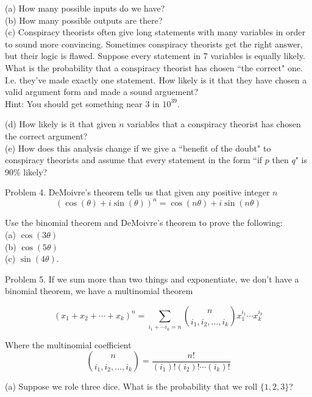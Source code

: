 \documentclass[16 pt]{amsart}
\theoremstyle{definition}
\theoremstyle{remark}
\numberwithin{equation}{subsection}
\begin{document}
(a) How many possible inputs do we have?\\

(b) How many possible outputs are there?\\

(c) Conspiracy theorists often give long statements with many variables in order to sound more convincing.  Sometimes conspiracy theorists get the right answer, but their logic is flawed.  Suppose every statement in 7 variables is equally likely.  What is the probability that a conspiracy theorist has chosen ``the correct" one.  I.e. they've made exactly one statement.  How likely is it that they have chosen a valid argument form and made a sound arguement?\\
Hint: You should get something near 3 in $10^{39}$.


(d) How likely is it that given $n$ variables that a conspiracy theorist has chosen the correct argument?\\

(e) How does this analysis change if we give a ``benefit of the doubt" to conspiracy theorists and assume that every statement in the form  ``if $p$ then $q$" is 90\% likely?

\newpage 

Problem 4. DeMoivre's theorem tells us that given any positive integer $n$
\[
(\cos(\theta)+ i \sin(\theta))^n = \cos(n\theta) + i \sin(n\theta)
\]

Use the binomial theorem and DeMoivre's theorem to prove the following:\\

(a) $\cos(3\theta)$\\

(b) $\cos(5\theta)$\\

(c) $\sin(4\theta)$.

\newpage

Problem 5. If we sum more than two things and exponentiate, we don't have a binomial theorem, we have a multinomial theorem

\[
(x_1 + x_2 + \cdots + x_k)^n = \sum_{i_1+\cdots i_k = n} \binom{n}{i_1,i_2,\dots,i_k}x_1^{i_1}\cdots x_k^{i_k}
\]

Where the multinomial coefficient
\[
\binom{n}{i_1,i_2,\dots,i_k} = \frac{n!}{(i_1)!(i_2)!\cdots(i_k)!}
\]

(a) Suppose we role three dice.  What is the probability that we roll $\{1,2,3\}$?\\
\end{document}
